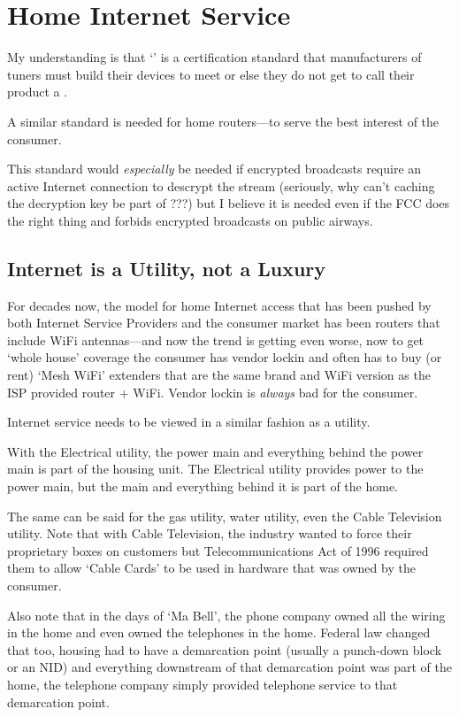 \chapter{Home Internet Service}
\label{apx:router}

My understanding is that `\ngtv{}' is a certification standard that manufacturers of 
tuners must build their devices to meet or else they do not get to call their product a \ngtv{}.

A similar standard is needed for home routers---to serve the best interest of the consumer.

This standard would \emph{especially} be needed if encrypted  broadcasts require an
active Internet connection to descrypt the stream (seriously, why can't caching the decryption
key be part of \ngtv{}???) but I believe it is needed even if the FCC does the right thing and
forbids encrypted broadcasts on public airways.

\section{Internet is a Utility, not a Luxury}

For decades now, the model for home Internet access that has been pushed by both Internet
Service Providers and the consumer market has been routers that include WiFi antennas---and now
the trend is getting even worse, now to get `whole house' coverage the consumer has vendor lockin
and often has to buy (or rent) `Mesh WiFi' extenders that are the same brand and WiFi version as
the ISP provided router + WiFi. Vendor lockin is \emph{always} bad for the consumer.

Internet service needs to be viewed in a similar fashion as a utility.

With the Electrical utility, the power main and everything behind the power main is part of the
housing unit. The Electrical utility provides power to the power main, but the main and everything
behind it is part of the home.

The same can be said for the gas utility, water utility, even the Cable Television utility. Note that
with Cable Television, the industry wanted to force their proprietary boxes on customers but
Telecommunications Act of 1996 required them to allow `Cable Cards' to be used in hardware that
was owned by the consumer.

Also note that in the days of `Ma Bell', the phone company owned all the wiring in the home and
even owned the telephones in the home. Federal law changed that too, housing had to have a
demarcation point (usually a punch-down block or an NID) and everything downstream of that
demarcation point was part of the home, the telephone company simply provided telephone service
to that demarcation point.

